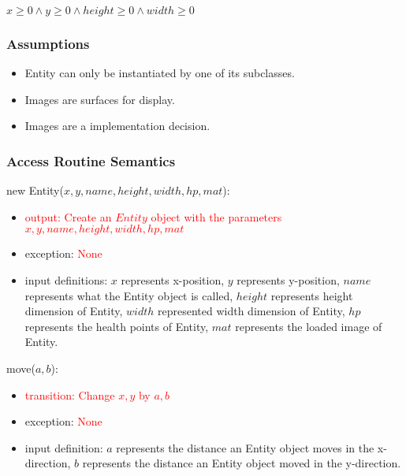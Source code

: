 \documentclass[12pt]{article}
\begin{document}
$x \geq 0 \land y \geq 0 \land height \geq 0 \land width \geq 0$

\subsubsection*{Assumptions}

\begin{itemize}
    \item Entity can only be instantiated by one of its subclasses.
    \item Images are surfaces for display.
    \item Images are a implementation decision.
\end{itemize}

\subsubsection*{Access Routine Semantics}

new Entity($x, y, name, height, width, hp, mat$):
\begin{itemize}
    
    \item \textcolor{red}{output: Create an $Entity$ object with the parameters $x, y, name, height, width, hp, mat$}
    \item exception: \textcolor{red}{None}
    \item input definitions: $x$ represents x-position, $y$ represents y-position, $name$ represents what the Entity object is called, $height$ represents height dimension of Entity, $width$ represented width dimension of Entity, $hp$ represents the health points of Entity, $mat$ represents the loaded image of Entity. 
\end{itemize}

\noindent move($a, b$):
\begin{itemize}
    \item \textcolor{red}{transition: Change $x, y$ by $a, b$}
    \item exception: \textcolor{red}{None}
    \item input definition: $a$ represents the distance an Entity object moves in the x-direction, $b$ represents the distance an Entity object moved in the y-direction.
\end{itemize}
\end{document}
